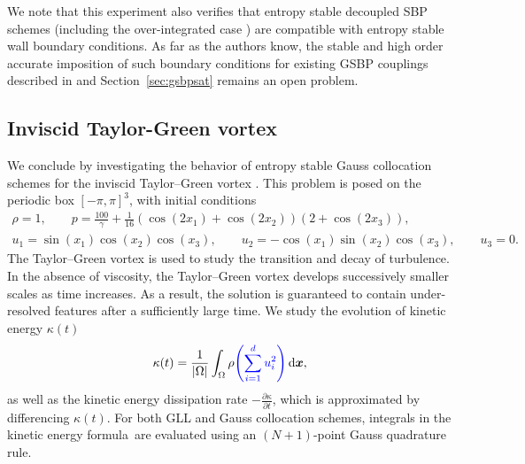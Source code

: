 \documentclass[review,onefignum,onetabnum,final]{siamart171218}
\newcommand{\pd}[2]{\frac{\partial#1}{\partial#2}}
\newcommand{\LRp}[1]{\left( #1 \right)}
\newcommand{\LRb}[1]{\left| #1 \right|}
\newcommand{\note}[1]{{\color{blue}{#1}}}
\newcommand*\diff[1]{\mathop{}\!{\mathrm{d}#1}}
\begin{document}
We note that this experiment also verifies that entropy stable decoupled SBP schemes (including the over-integrated case \cite{chan2017discretely}) are compatible with entropy stable wall boundary conditions.  As far as the authors know, the stable and high order accurate imposition of such boundary conditions for existing GSBP couplings described in \cite{crean2017high} and Section~\ref{sec:gsbpsat} remains an open problem.  

\subsection{Inviscid Taylor-Green vortex}

We conclude by investigating the behavior of entropy stable Gauss collocation schemes for the inviscid Taylor--Green vortex \cite{ae1937mechanism, gassner2016split, crean2018entropy}.  This problem is posed on the periodic box $[-\pi,\pi]^3$, with initial conditions 
\begin{gather*}
\rho = 1, \qquad p = \frac{100}{\gamma} + \frac{1}{16} \LRp{\cos(2x_1) + \cos(2x_2)}\LRp{2+\cos(2x_3)},\\
u_1 = \sin(x_1)\cos(x_2)\cos(x_3), \qquad
u_2 = -\cos(x_1)\sin(x_2)\cos(x_3),\qquad
u_3 = 0.
\end{gather*}
The Taylor--Green vortex is used to study the transition and decay of turbulence.  In the absence of viscosity, the Taylor--Green vortex develops successively smaller scales as time increases.  As a result, the solution is guaranteed to contain under-resolved features after a sufficiently large time.  We study the evolution of kinetic energy $\kappa(t)$ 
\[
\kappa(t) =\frac{1}{\LRb{\Omega}} \int_{\Omega} \rho \note{ \LRp{\sum_{i=1}^d u_i^2}} \diff{\bm{x}},
\]
as well as the kinetic energy dissipation rate $-\pd{\kappa}{t}$, which is approximated by differencing $\kappa(t)$.  For both GLL and Gauss collocation schemes, integrals in the kinetic energy formula are evaluated using an $(N+1)$-point Gauss quadrature rule.
\end{document}

